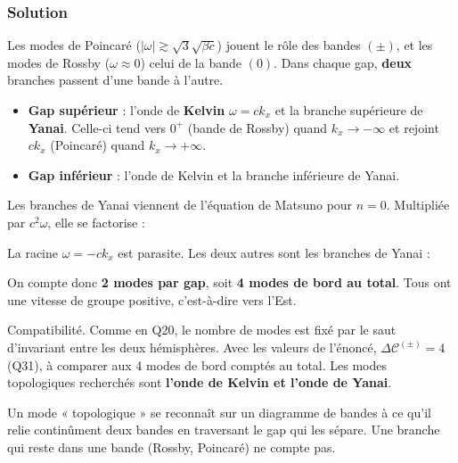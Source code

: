 \documentclass[11pt,a4paper]{article}
\providecommand{\tightlist}{\setlength{\itemsep}{0pt}\setlength{\parskip}{0pt}}
\newcommand{\equationajustee}[1]{%
  \sbox{\boiteequation}{$\displaystyle #1$}%
  \ifdim\wd\boiteequation>\linewidth
    \[\resizebox{\linewidth}{!}{\usebox{\boiteequation}}\]%
  \else
    \[#1\]%
  \fi}
\begin{document}
\hypertarget{solution-41}{%
\subsubsection{Solution}\label{solution-41}}

Les modes de Poincaré (\(\lvert\omega\rvert\gtrsim\sqrt3\sqrt{\beta c}\)) jouent le rôle des bandes \((\pm)\), et les modes de Rossby (\(\omega\approx0\)) celui de la bande \((0)\). Dans chaque gap, \textbf{deux} branches passent d'une bande à l'autre.

\begin{itemize}
\tightlist
\item
  \textbf{Gap supérieur} : l'onde de \textbf{Kelvin} \(\omega=ck_x\) et la branche supérieure de \textbf{Yanai}. Celle-ci tend vers \(0^+\) (bande de Rossby) quand \(k_x\to-\infty\) et rejoint \(ck_x\) (Poincaré) quand \(k_x\to+\infty\).
\item
  \textbf{Gap inférieur} : l'onde de Kelvin et la branche inférieure de Yanai.
\end{itemize}

Les branches de Yanai viennent de l'équation de Matsuno pour \(n=0\). Multipliée par \(c^2\omega\), elle se factorise :

\equationajustee{(\omega+ck_x)(\omega^2-ck_x\omega-\beta c)=0}

La racine \(\omega=-ck_x\) est parasite. Les deux autres sont les branches de Yanai :

\equationajustee{\omega=\frac12\left(ck_x\pm\sqrt{c^2k_x^2+4\beta c}\right)}

On compte donc \textbf{2 modes par gap}, soit \textbf{4 modes de bord au total}. Tous ont une vitesse de groupe positive, c'est-à-dire vers l'Est.

Compatibilité. Comme en Q20, le nombre de modes est fixé par le saut d'invariant entre les deux hémisphères. Avec les valeurs de l'énoncé, \(\Delta\mathscr C^{(\pm)}=4\) (Q31), à comparer aux 4 modes de bord comptés au total. Les modes topologiques recherchés sont \textbf{l'onde de Kelvin et l'onde de Yanai}.

\begin{methode}

Un mode « topologique » se reconnaît sur un diagramme de bandes à ce qu'il relie continûment deux bandes en traversant le gap qui les sépare. Une branche qui reste dans une bande (Rossby, Poincaré) ne compte pas.

\end{methode}
\end{document}
